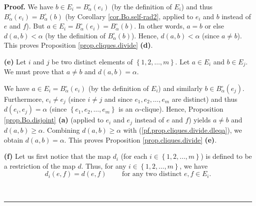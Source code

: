 \documentclass[numbers=enddot,12pt,final,onecolumn,notitlepage]{scrartcl}%
\theoremstyle{definition}
\newenvironment{proof}[1][Proof]{\noindent\textbf{#1.} }{\ \rule{0.5em}{0.5em}}
\renewcommand{\geq}{\geqslant}
\theoremstyle{plainsl}
\begin{document}
\begin{proof}
We have $b\in E_{i}=B_{\alpha}^{\circ}\left(  e_{i}\right)  $ (by the
definition of $E_{i}$) and thus $B_{\alpha}^{\circ}\left(  e_{i}\right)
=B_{\alpha}^{\circ}\left(  b\right)  $ (by Corollary \ref{cor.Bo.self-rad2},
applied to $e_{i}$ and $b$ instead of $e$ and $f$). But $a\in E_{i}=B_{\alpha
}^{\circ}\left(  e_{i}\right)  =B_{\alpha}^{\circ}\left(  b\right)  $. In
other words, $a=b$ or else $d\left(  a,b\right)  <\alpha$ (by the definition
of $B_{\alpha}^{\circ}\left(  b\right)  $). Hence, $d\left(  a,b\right)
<\alpha$ (since $a\neq b$). This proves Proposition \ref{prop.cliques.divide}
\textbf{(d)}. \medskip

\textbf{(e)} Let $i$ and $j$ be two distinct elements of $\left\{
1,2,\ldots,m\right\}  $. Let $a\in E_{i}$ and $b\in E_{j}$. We must prove that
$a\neq b$ and $d\left(  a,b\right)  =\alpha$.

We have $a\in E_{i}=B_{\alpha}^{\circ}\left(  e_{i}\right)  $ (by the
definition of $E_{i}$) and similarly $b\in B_{\alpha}^{\circ}\left(
e_{j}\right)  $. Furthermore, $e_{i}\neq e_{j}$ (since $i\neq j$ and since
$e_{1},e_{2},\ldots,e_{m}$ are distinct) and thus $d\left(  e_{i}%
,e_{j}\right)  =\alpha$ (since $\left\{  e_{1},e_{2},\ldots,e_{m}\right\}  $
is an $\alpha$-clique). Hence, Proposition \ref{prop.Bo.disjoint} \textbf{(a)}
(applied to $e_{i}$ and $e_{j}$ instead of $e$ and $f$) yields $a\neq b$ and
$d\left(  a,b\right)  \geq\alpha$. Combining $d\left(  a,b\right)  \geq\alpha$
with (\ref{pf.prop.cliques.divide.dleqa}), we obtain $d\left(  a,b\right)
=\alpha$. This proves Proposition \ref{prop.cliques.divide} \textbf{(e)}.
\medskip

\textbf{(f)} Let us first notice that the map $d_{i}$ (for each $i\in\left\{
1,2,\ldots,m\right\}  $) is defined to be a restriction of the map $d$. Thus,
for any $i\in\left\{  1,2,\ldots,m\right\}  $, we have
\begin{equation}
d_{i}\left(  e,f\right)  =d\left(  e,f\right)  \ \ \ \ \ \ \ \ \ \ \text{for
any two distinct }e,f\in E_{i}. \label{pf.prop.cliques.divide.e.dres}%
\end{equation}



\end{proof}
\end{document}
